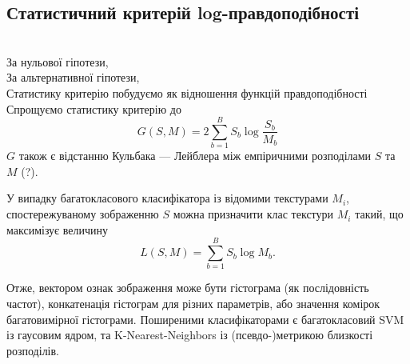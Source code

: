 \subsection{Статистичний критерій log-правдоподібності}\label{section1.3a}\hfill

 \\

За нульової гіпотези, \todo{} \\
За альтернативної гіпотези, \todo{} \\
Статистику критерію побудуємо як відношення функцій правдоподібності \todo{}  \\
Спрощуємо статистику критерію до 
\begin{equation}\label{e:classify-1}
    G(S,M) = 2\sum_{b=1}^B S_b \log \frac{S_b}{M_b}
\end{equation}
$G$ також є відстанню Кульбака — Лейблера між емпіричними розподілами $S$ та $M$ (?). \\

У випадку багатокласового класифікатора із відомими текстурами $M_i$, спостережуваному зображенню $S$ можна призначити клас текстури $M_i$ такий,
що максимізує величину
\begin{equation}\label{e:classify-2}
    L(S,M) = \sum_{b=1}^B S_b \log M_b.
\end{equation}

\todo{}

Отже, вектором ознак зображення може бути гістограма (як послідовність частот), конкатенація гістограм для різних параметрів, або значення комірок багатовимірної гістограми.
Поширеними класифікаторами є багатокласовий SVM із гаусовим ядром, та K-Nearest-Neighbors із \mbox{(псевдо-)метрикою} близкості розподілів.

